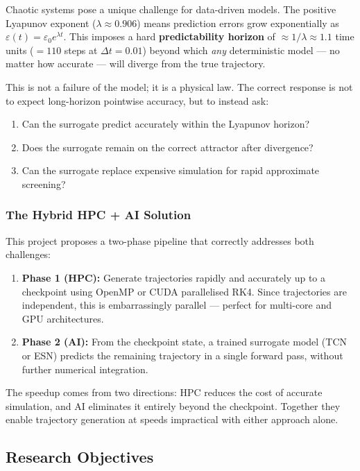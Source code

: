 \documentclass[11pt,a4paper]{article}
\begin{document}
Chaotic systems pose a unique challenge for data-driven models. The positive Lyapunov
exponent ($\lambda \approx 0.906$) means prediction errors grow exponentially as
$\varepsilon(t) = \varepsilon_0 e^{\lambda t}$. This imposes a hard
\textbf{predictability horizon} of $\approx 1/\lambda \approx 1.1$ time units
($= 110$ steps at $\Delta t=0.01$) beyond which \textit{any} deterministic model
--- no matter how accurate --- will diverge from the true trajectory.

This is not a failure of the model; it is a physical law. The correct response is not
to expect long-horizon pointwise accuracy, but to instead ask:
\begin{enumerate}
  \item Can the surrogate predict accurately within the Lyapunov horizon?
  \item Does the surrogate remain on the correct attractor after divergence?
  \item Can the surrogate replace expensive simulation for rapid approximate screening?
\end{enumerate}

\subsubsection{The Hybrid HPC + AI Solution}

This project proposes a two-phase pipeline that correctly addresses both challenges:

\begin{enumerate}
  \item \textbf{Phase 1 (HPC):} Generate trajectories rapidly and accurately up to
        a checkpoint using OpenMP or CUDA parallelised RK4. Since trajectories are
        independent, this is embarrassingly parallel --- perfect for multi-core and
        GPU architectures.
  \item \textbf{Phase 2 (AI):} From the checkpoint state, a trained surrogate model
        (TCN or ESN) predicts the remaining trajectory in a single forward pass,
        without further numerical integration.
\end{enumerate}

The speedup comes from two directions: HPC reduces the cost of accurate simulation,
and AI eliminates it entirely beyond the checkpoint. Together they enable trajectory
generation at speeds impractical with either approach alone.

\subsection{Research Objectives}
\end{document}
